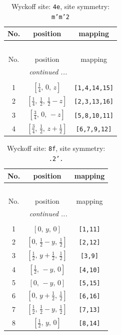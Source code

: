 \documentclass[fleqn,8pt]{jsarticle}
\begin{document}
\renewcommand{\arraystretch}{1.2}
\begin{longtable}{ccc}
\caption{Wyckoff site: {\tt 4e}, site symmetry: {\tt m'm'2}}
 \\
 \hline \hline
No. & position & mapping \\ \hline \endfirsthead

\multicolumn{2}{l}{\tablename\ \thetable{}} \\
 \hline \hline
No. & position & mapping \\ \hline \endhead

 \hline \hline
\multicolumn{2}{r}{\footnotesize\it continued ...} \\ \endfoot

 \hline \hline
\multicolumn{2}{r}{} \\ \endlastfoot

1 & $\left[ \frac{1}{4},\, 0,\, z \right]$ & {\tt [1,4,14,15]} \\ \hline
2 & $\left[ \frac{1}{4},\, \frac{1}{2},\, \frac{1}{2} - z \right]$ & {\tt [2,3,13,16]} \\ \hline
3 & $\left[ \frac{3}{4},\, 0,\, - z \right]$ & {\tt [5,8,10,11]} \\ \hline
4 & $\left[ \frac{3}{4},\, \frac{1}{2},\, z + \frac{1}{2} \right]$ & {\tt [6,7,9,12]} \\
\end{longtable}
\renewcommand{\arraystretch}{1.2}
\begin{longtable}{ccc}
\caption{Wyckoff site: {\tt 8f}, site symmetry: {\tt .2'.}}
 \\
 \hline \hline
No. & position & mapping \\ \hline \endfirsthead

\multicolumn{2}{l}{\tablename\ \thetable{}} \\
 \hline \hline
No. & position & mapping \\ \hline \endhead

 \hline \hline
\multicolumn{2}{r}{\footnotesize\it continued ...} \\ \endfoot

 \hline \hline
\multicolumn{2}{r}{} \\ \endlastfoot

1 & $\left[ 0,\, y,\, 0 \right]$ & {\tt [1,11]} \\ \hline
2 & $\left[ 0,\, \frac{1}{2} - y,\, \frac{1}{2} \right]$ & {\tt [2,12]} \\ \hline
3 & $\left[ \frac{1}{2},\, y + \frac{1}{2},\, \frac{1}{2} \right]$ & {\tt [3,9]} \\ \hline
4 & $\left[ \frac{1}{2},\, - y,\, 0 \right]$ & {\tt [4,10]} \\ \hline
5 & $\left[ 0,\, - y,\, 0 \right]$ & {\tt [5,15]} \\ \hline
6 & $\left[ 0,\, y + \frac{1}{2},\, \frac{1}{2} \right]$ & {\tt [6,16]} \\ \hline
7 & $\left[ \frac{1}{2},\, \frac{1}{2} - y,\, \frac{1}{2} \right]$ & {\tt [7,13]} \\ \hline
8 & $\left[ \frac{1}{2},\, y,\, 0 \right]$ & {\tt [8,14]} \\
\end{longtable}
\end{document}
